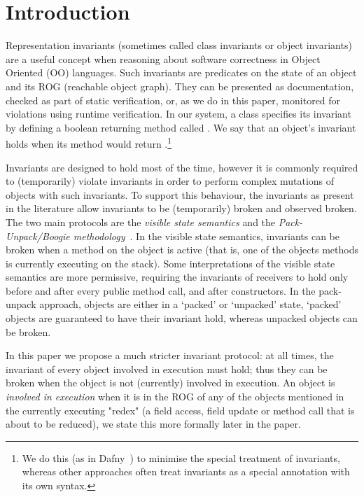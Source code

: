 \section{Introduction}
\label{s:intro}
Representation invariants (sometimes called class invariants or object invariants) are
a useful concept when reasoning about software correctness in Object Oriented (OO) languages. Such invariants are predicates on the state of an object and its ROG (reachable object graph).
They can be presented as documentation, checked as part of static verification, or, as we do in this paper, monitored for violations using runtime verification.
In our system, a class specifies its invariant by defining a boolean returning method called \Q@invariant@.
We say that an object's invariant holds when its \Q@invariant@ method would return \Q@true@.\footnote{We do this (as in Dafny~\cite{DBLP:conf/sigada/Leino12}) to minimise the special treatment of invariants, whereas other approaches often treat invariants as a special annotation with its own syntax.}

Invariants are designed to hold most of the time, however it is commonly required to (temporarily) violate invariants in order to perform complex mutations of objects with such invariants.
To support this behaviour, the invariants as present in the literature allow invariants to be (temporarily) broken and observed broken.
The two main protocols are the \emph{visible state semantics} \cite{Meyer:1988:OSC:534929} and the \emph{Pack-Unpack/Boogie methodology}~\cite{DBLP:journals/jot/BarnettDFLS04}.
In the visible state semantics, invariants can be broken when a method on the object is active (that is, one of the objects methods is currently executing on the stack).
Some interpretations of the visible state semantics are more permissive, requiring the invariants of receivers to hold only before and after every public method call, and after constructors. 
In the pack-unpack approach, objects are either in a `packed' or `unpacked' state, 
`packed' objects are guaranteed to have their invariant hold, whereas unpacked objects can be broken.

In this paper we propose a much stricter invariant protocol: at all times, the invariant of every object involved in execution must hold; thus they can be broken when the object is not (currently) involved in execution. An object is \emph{involved in execution} when it is in the ROG of any of the objects mentioned in the currently executing "redex" (a field access, field update or method call that is about to be reduced), we state this more formally later in the paper.

